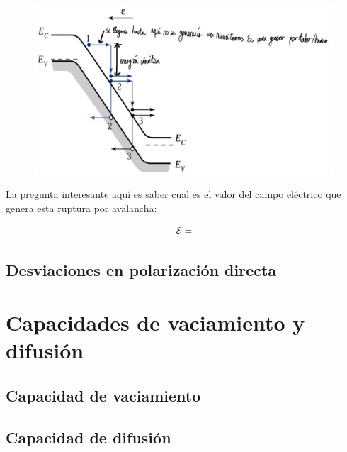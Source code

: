 \begin{figure}[h!] \centering
    \includegraphics[width=0.7\linewidth]{Cuerpo/Ch_03/03_Temario_06.png}
\end{figure}
La pregunta interesante aquí es saber cual es el valor del campo eléctrico que genera esta ruptura por avalancha: 

\begin{equation}
    \mathcal{E} = 
\end{equation}




\subsection{Desviaciones en polarización directa}





\section{Capacidades de vaciamiento y difusión}

\subsection{Capacidad de vaciamiento}

\subsection{Capacidad de difusión}

